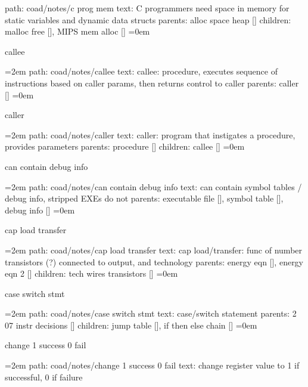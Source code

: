 path: coad/notes/c prog mem
\smallskip
text:  C programmers need space in memory for static variables and dynamic data structs
\smallskip
parents:  alloc space heap []
\smallskip
children: malloc free [], MIPS mem alloc []
\smallskip
\leftskip=0em
\par\endgroup
\bigskip
{}
callee
\smallskip
\par\begingroup
\leftskip=2em
path: coad/notes/callee
\smallskip
text:  callee: procedure, executes sequence of instructions based on caller params, then returns control to caller
\smallskip
parents:  caller []
\smallskip
\leftskip=0em
\par\endgroup
\bigskip
{}
caller
\smallskip
\par\begingroup
\leftskip=2em
path: coad/notes/caller
\smallskip
text:  caller: program that instigates a procedure, provides parameters
\smallskip
parents:  procedure []
\smallskip
children: callee []
\smallskip
\leftskip=0em
\par\endgroup
\bigskip
{}
can contain debug info
\smallskip
\par\begingroup
\leftskip=2em
path: coad/notes/can contain debug info
\smallskip
text:  can contain symbol tables / debug info, stripped EXEs do not
\smallskip
parents:  executable file [], symbol table [], debug info []
\smallskip
\leftskip=0em
\par\endgroup
\bigskip
{}
cap load transfer
\smallskip
\par\begingroup
\leftskip=2em
path: coad/notes/cap load transfer
\smallskip
text:  cap load/transfer: func of number transistors (?) connected to output, and technology
\smallskip
parents:  energy eqn [], energy eqn 2 []
\smallskip
children: tech wires transistors []
\smallskip
\leftskip=0em
\par\endgroup
\bigskip
{}
case switch stmt
\smallskip
\par\begingroup
\leftskip=2em
path: coad/notes/case switch stmt
\smallskip
text:  case/switch statement
\smallskip
parents:  2 07 instr decisions []
\smallskip
children: jump table [], if then else chain []
\smallskip
\leftskip=0em
\par\endgroup
\bigskip
{}
change 1 success 0 fail
\smallskip
\par\begingroup
\leftskip=2em
path: coad/notes/change 1 success 0 fail
\smallskip
text:  change register value to 1 if successful, 0 if failure
